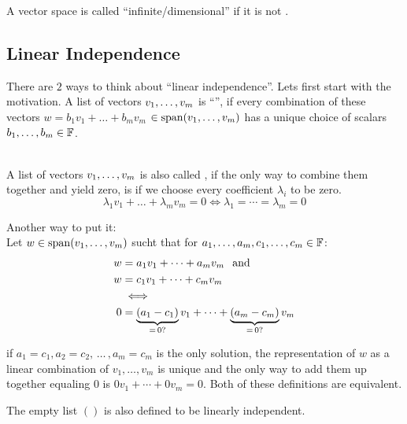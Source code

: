 \setcounter{thm}{12}
\begin{mydef}
  A vector space is called ``infinite\-/dimensional'' if it is not \fd. 
\end{mydef}


\subsection{Linear Independence}

\setcounter{thm}{14}
\begin{mydef} 
  There are $2$ ways to think about ``linear independence''. Lets first start with the motivation. A list of vectors $v_1, \dots, v_m$ is ``\lid'', if every combination of these vectors $w = b_1v_1 + \dots+ b_mv_m$ $\in \operatorname{span} (v_1, \dots, v_m)$ has a unique choice of scalars $b_1, \dots, b_m \in \mathbb{F}$.

   \\
  A list of vectors $v_1, \dots, v_m$ is also called \lid, if the only way to combine them together and yield zero, is if we choose every coefficient $\lambda_i$ to be zero.
  \begin{equation}
    \lambda_1v_1 + \dots + \lambda_mv_m = 0 \iff \lambda_1 = \cdots = \lambda_m = 0
  \end{equation}

  Another way to put it:\\
  Let $w\in \operatorname{span} (v_1, \dots, v_m)$ sucht that for $a_1, \dots, a_m, c_1, \dots, c_m \in \mathbb{F}$:
  \begin{equation}
    \begin{aligned}
      w & =a_1 v_1 + \cdots + a_m v_m \;\;\, \text{and}\;\; \\
      w & =c_1 v_1 + \cdots + c_m v_m \\
      & \iff \\
      0 & = \underbrace{(a_1 - c_1)}_{= \, 0\text{?}} v_1 + \cdots + \underbrace{(a_m -c_m)}_{= \, 0\text{?}} v_m
    \end{aligned}
  \end{equation}

  if $a_1 = c_1, a_2 = c_2, \, \dots \, , a_m = c_m$ is the only solution, the representation of $w$ as a linear combination of $v_1, \ldots, v_m$ is unique and the only way to add them up together equaling $0$ is $0v_1+\cdots+0v_m=0$. Both of these definitions are equivalent.

  The empty list $()$ is also defined to be linearly independent.
\end{mydef}




